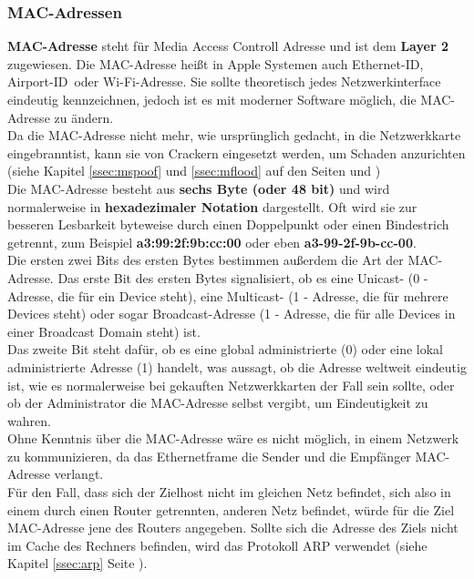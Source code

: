 \documentclass[12pt,a4paper]{report}
\begin{document}
\begin{onehalfspace}
\subsubsection{MAC-Adressen}\label{sssec:macaddr}
\textbf{MAC-Adresse} steht für Media Access Controll Adresse und ist dem \textbf{Layer 2} zugewiesen. Die MAC-Adresse heißt in Apple Systemen auch \glqq Ethernet-ID\grqq , \glqq Airport-ID\grqq \ oder \glqq Wi-Fi-Adresse\grqq . Sie sollte theoretisch jedes Netzwerkinterface eindeutig kennzeichnen, jedoch ist es mit moderner Software möglich, die MAC-Adresse zu ändern.\\
Da die MAC-Adresse nicht mehr, wie ursprünglich gedacht, in die Netzwerkkarte \glqq eingebrannt\grqq ist, kann sie von Crackern eingesetzt werden, um Schaden anzurichten (siehe Kapitel \ref{ssec:mspoof} und \ref{ssec:mflood} auf den Seiten \pageref{ssec:mspoof} und \pageref{ssec:mflood})\\

Die MAC-Adresse besteht aus \textbf{sechs Byte (oder 48 bit)} und wird normalerweise in \textbf{hexadezimaler Notation} dargestellt. Oft wird sie zur besseren Lesbarkeit byteweise durch einen Doppelpunkt oder einen Bindestrich getrennt, zum Beispiel \textbf{a3:99:2f:9b:cc:00} oder eben \textbf{a3-99-2f-9b-cc-00}.\\

Die ersten zwei Bits des ersten Bytes bestimmen außerdem die Art der MAC-Adresse. Das erste Bit des ersten Bytes signalisiert, ob es eine Unicast- (0 - Adresse, die für ein Device steht), eine Multicast-   (1 - Adresse, die für mehrere Devices steht) oder sogar Broadcast-Adresse (1 - Adresse, die für alle Devices in einer Broadcast Domain steht) ist.\\
Das zweite Bit steht dafür, ob es eine global administrierte (0) oder eine lokal administrierte Adresse (1) handelt, was aussagt, ob die Adresse weltweit eindeutig ist, wie es normalerweise bei gekauften Netzwerkkarten der Fall sein sollte, oder ob der Administrator die MAC-Adresse selbst vergibt, um Eindeutigkeit zu wahren.\\

Ohne Kenntnis über die MAC-Adresse wäre es nicht möglich, in einem Netzwerk zu kommunizieren, da das Ethernetframe die Sender und die Empfänger MAC-Adresse verlangt.\\
Für den Fall, dass sich der Zielhost nicht im gleichen Netz befindet, sich also in einem durch einen Router getrennten, anderen Netz befindet, würde für die Ziel MAC-Adresse jene des Routers angegeben. Sollte sich die Adresse des Ziels nicht im Cache des Rechners befinden, wird das Protokoll ARP verwendet (siehe Kapitel \ref{ssec:arp} Seite \pageref{ssec:arp}). 

\end{onehalfspace}
\end{document}
